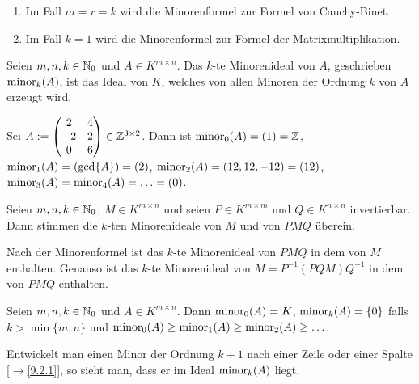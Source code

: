\documentclass[../../main.tex]{subfiles}
\begin{document}
\begin{bem}\label{17.2.9}
\begin{enumerate}[\normalfont(a)]
\item Im Fall $m=r=k$ wird die Minorenformel zur Formel von Cauchy-Binet.
\item Im Fall $k=1$ wird die Minorenformel zur Formel der Matrixmultiplikation.
\end{enumerate}
\end{bem}

\begin{df}\label{17.2.10}
Seien $m,n,k\in \mathbb N_0$ und $A\in K^{m\times n}$. Das $k$-te Minorenideal von $A$, geschrieben $\operatorname{minor}_k(A)$, ist das Ideal von $K$, welches von allen Minoren der Ordnung $k$ von $A$ erzeugt wird.
\end{df}

\begin{bsp}\label{17.2.11}
Sei $A:=\begin{pmatrix}2&4\\-2&2\\0&6\end{pmatrix}\in \mathbb Z^{3\times 2}$. Dann ist $\operatorname{minor}_0(A)=(1)=\mathbb Z$, $\operatorname{minor}_1(A)=(\gcd\{A\})=(2)$, $\operatorname{minor}_2(A)=(12,12,-12)=(12)$, $\operatorname{minor}_3(A)=\operatorname{minor}_4(A)=\ldots =(0)$.
\end{bsp}

\begin{kor}\label{17.2.12}
Seien $m,n,k\in\mathbb N_0$, $M\in K^{m\times n}$ und seien $P\in K^{m\times m}$ und $Q\in K^{n\times n}$ invertierbar. Dann stimmen die $k$-ten Minorenideale von $M$ und von $PMQ$ überein. 
\end{kor}
\begin{cproof}
Nach der Minorenformel ist das $k$-te Minorenideal von $PMQ$ in dem von $M$ enthalten. Genauso ist das $k$-te Minorenideal von $M=P^{-1}(PQM)Q^{-1}$ in dem von $PMQ$ enthalten.
\end{cproof}

\begin{pro}\label{17.2.13}
Seien $m,n,k\in\mathbb N_0$ und $A\in K^{m\times n}$. Dann $\operatorname{minor}_0(A)=K$, $\operatorname{minor}_k(A)=\{0\}$ falls $k>\min\{m,n\}$ und $\operatorname{minor}_0(A)\ge \operatorname{minor}_1(A)\ge\operatorname{minor}_2(A)\ge\ldots $.
\end{pro}
\begin{cproof}
Entwickelt man einen Minor der Ordnung $k+1$ nach einer Zeile oder einer Spalte [$\to$\ref{9.2.1}], so sieht man, dass er im Ideal $\operatorname{minor}_k(A)$ liegt.
\end{cproof}
\end{document}
